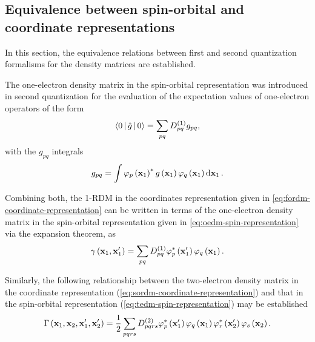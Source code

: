 \subsection{Equivalence between spin-orbital and coordinate representations}
In this section, the equivalence relations between first and second quantization
formalisms for the density matrices are established.


The one-electron density matrix in the spin-orbital representation was
introduced in second quantization for the evaluation of the expectation values
of one-electron operators of the form 
\begin{equation}
    \Braket{0 | \hat{g} | 0} =
    \sum_{pq} \oedm_{pq} g_{pq}
    ,
\end{equation}
with the $g_{pq}$ integrals 
\begin{equation}
    g_{pq} = \int
    \varphi_p \left( \boldsymbol{\mathrm{x}}_1 \right)^{*} 
    g \left( \boldsymbol{\mathrm{x}}_1 \right) 
    \varphi_q \left( \boldsymbol{\mathrm{x}}_1 \right)
    \dd{ \boldsymbol{\mathrm{x}}_1}
    .
\end{equation}

Combining both, the 1-RDM in the coordinates representation given in 
\cref{eq:fordm-coordinate-representation} can be written
in terms of the one-electron density matrix in the spin-orbital representation
given in \cref{eq:oedm-spin-representation} via the expansion theorem, as
\begin{equation}
    \gamma \left( \boldsymbol{\mathrm{x}}_1, \boldsymbol{\mathrm{x}}_1^{\prime} \right) =
    \sum_{pq} D^{\left( 1 \right)}_{pq} 
    \varphi_p^{*} \left( \boldsymbol{\mathrm{x}}_1^{\prime} \right)
    \varphi_q \left( \boldsymbol{\mathrm{x}}_1 \right)
    .
\end{equation}

Similarly, the following relationship between the two-electron density matrix
in the coordinate representation (\cref{eq:sordm-coordinate-representation}) 
and that in the spin-orbital representation (\cref{eq:tedm-spin-representation})
may be established
\begin{equation}
    \Gamma \left( \boldsymbol{\mathrm{x}}_1, \boldsymbol{\mathrm{x}}_2, \boldsymbol{\mathrm{x}}_1^{\prime}, \boldsymbol{\mathrm{x}}_2^{\prime} \right)
    =
    \frac{1}{2} \sum_{pqrs} D^{\left( 2 \right)}_{pqrs}
    \varphi_p^{*}\left( \boldsymbol{\mathrm{x}}_1^{\prime} \right)
    \varphi_q    \left( \boldsymbol{\mathrm{x}}_1          \right)
    \varphi_r^{*}\left( \boldsymbol{\mathrm{x}}_2^{\prime} \right)
    \varphi_s    \left( \boldsymbol{\mathrm{x}}_2          \right)
    .
\end{equation}


